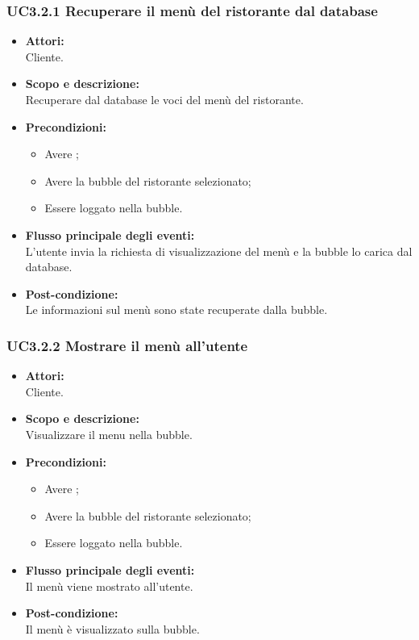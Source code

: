\subsubsection{UC3.2.1 Recuperare il menù del ristorante dal database} \label{UC3.2.1}

\begin{itemize}
	\item \textbf{Attori:}
	\\Cliente.
	\item \textbf{Scopo e descrizione:} 
	\\Recuperare dal database le voci del menù del ristorante.
	\item \textbf{Precondizioni:}
	\begin{itemize}
		\item Avere ;
		\item Avere la bubble del ristorante selezionato;
		\item Essere loggato nella bubble.
	\end{itemize}
	\item \textbf{Flusso principale degli eventi:}
	\\L’utente invia la richiesta di visualizzazione del menù e la bubble lo carica dal database.
	\item \textbf{Post-condizione:}
	\\Le informazioni sul menù sono state recuperate dalla bubble.
\end{itemize}

\subsubsection{UC3.2.2 Mostrare il menù all’utente} \label{UC3.2.2}

\begin{itemize}
	\item \textbf{Attori:}
	\\Cliente.
	\item \textbf{Scopo e descrizione:} 
	\\Visualizzare il menu nella bubble.
	\item \textbf{Precondizioni:}
	\begin{itemize}
		\item Avere ;
		\item Avere la bubble del ristorante selezionato;
		\item Essere loggato nella bubble.
	\end{itemize}
	\item \textbf{Flusso principale degli eventi:}
	\\Il menù viene mostrato all’utente.
	\item \textbf{Post-condizione:}
	\\Il menù è visualizzato sulla bubble.
\end{itemize}

